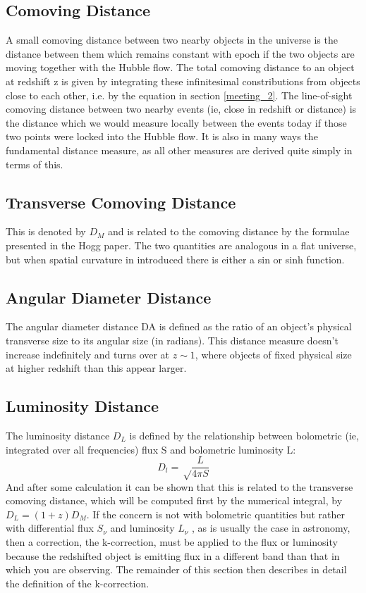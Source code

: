 \documentclass{literature}
\begin{document}
\subsection{Comoving Distance}\label{subs:comoving_distance}
A small comoving distance between two nearby objects in the universe is the distance between them which remains constant with epoch if the two objects are moving together with the Hubble flow. The total comoving distance to an object at redshift z is given by integrating these infinitesimal constributions from objects close to each other, i.e. by the equation in section \ref{meeting_2}. The line-of-sight comoving distance between two nearby events (ie, close in redshift or distance) is the distance which we would measure locally between the events today if those two points were locked into the Hubble flow. It is also in many ways the fundamental distance measure, as all other measures are derived quite simply in terms of this. 
\subsection{Transverse Comoving Distance}\label{subs:transverse_comoving_distance}
This is denoted by $D_{M}$ and is related to the comoving distance by the formulae presented in the Hogg paper. The two quantities are analogous in a flat universe, but when spatial curvature in introduced there is either a sin or sinh function. 
\subsection{Angular Diameter Distance}\label{subs:Angular Diameter distance}
The angular diameter distance DA is defined as the ratio of an object’s physical transverse size to its angular size (in radians). This distance measure doesn't increase indefinitely and turns over at $z \sim 1$, where objects of fixed physical size at higher redshift than this appear larger.
\subsection{Luminosity Distance}\label{subs:Luminosity distance}
The luminosity distance $D_{L}$ is defined by the relationship between bolometric (ie, integrated over all frequencies) flux S and bolometric luminosity L:
\begin{equation}
	D_{l} = \sqrt \frac{L}{4\pi S}
\end{equation}
And after some calculation it can be shown that this is related to the transverse comoving distance, which will be computed first by the numerical integral, by $D_{L} = (1 + z)D_{M}$. If the concern is not with bolometric quantities but rather with differential flux $S_{\nu}$ and luminosity $L_{\nu}$ , as is usually the case in astronomy, then a correction, the k-correction, must be applied to the flux or luminosity because the redshifted object is emitting flux in a different band than that in which you are observing. The remainder of this section then describes in detail the definition of the k-correction.
\end{document}
